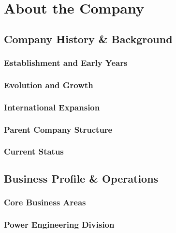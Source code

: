 
\chapter{About the Company}

\section{Company History \& Background}

\subsection{Establishment and Early Years}

\subsection{Evolution and Growth}

\subsection{International Expansion}

\subsection{Parent Company Structure}

\subsection{Current Status}

\section{Business Profile \& Operations}

\subsection{Core Business Areas}

\subsection{Power Engineering Division}

